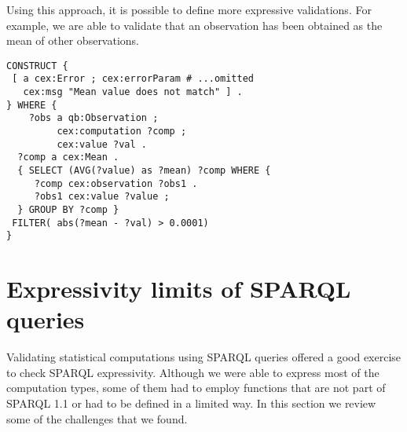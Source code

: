 Using this approach, it is possible to define more expressive validations.
For example, we are able to validate that an observation has been obtained as
the mean of other observations. 

\begin{lstlisting}[style=SPARQL]
CONSTRUCT {
 [ a cex:Error ; cex:errorParam # ...omitted 
   cex:msg "Mean value does not match" ] . 
} WHERE { 
    ?obs a qb:Observation ;
         cex:computation ?comp ;
         cex:value ?val .
  ?comp a cex:Mean .
  { SELECT (AVG(?value) as ?mean) ?comp WHERE {
     ?comp cex:observation ?obs1 .
	 ?obs1 cex:value ?value ;
  } GROUP BY ?comp } 
 FILTER( abs(?mean - ?val) > 0.0001)
}
\end{lstlisting}

\section{Expressivity limits of SPARQL queries}

Validating statistical computations using SPARQL queries offered 
 a good exercise to check SPARQL expressivity. Although we were able 
 to express most of the computation types, some of them had to employ functions
 that are not part of SPARQL 1.1 or had to be defined in a limited way. 
 In this section we review some of the challenges that we found.

